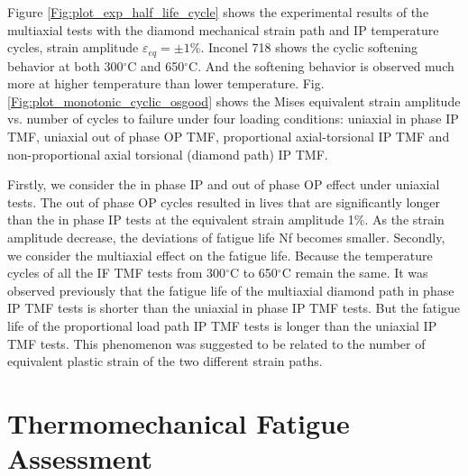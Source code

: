 \documentclass[preprint,5p,twocolumn,11pt,sort&compress]{elsarticle}
\begin{document}
Figure \ref{Fig:plot_exp_half_life_cycle} shows the experimental results of the multiaxial tests with the diamond mechanical strain path and IP temperature cycles, strain amplitude $\varepsilon_{eq} = \pm1$\%. Inconel 718 shows the cyclic softening behavior at both 300$^\circ$C and 650$^\circ$C. And the softening behavior is observed much more at higher temperature than lower temperature.
Fig. \ref{Fig:plot_monotonic_cyclic_osgood} shows the Mises equivalent strain amplitude vs. number of cycles to failure under four loading conditions: uniaxial in phase IP TMF, uniaxial out of phase OP TMF, proportional axial-torsional IP TMF and non-proportional axial torsional (diamond path) IP TMF.

Firstly, we consider the in phase IP and out of phase OP effect under uniaxial tests. The out of phase OP cycles resulted in lives that are significantly longer than the in phase IP tests at the equivalent strain amplitude 1\%. As the strain amplitude decrease, the deviations of fatigue life Nf  becomes smaller.
Secondly, we consider the multiaxial effect on the fatigue life. Because the temperature cycles of all the IF TMF tests from 300$^\circ$C to 650$^\circ$C remain the same. It was observed previously that the fatigue life of the multiaxial diamond path in phase IP TMF tests is shorter than the uniaxial in phase IP TMF tests. But the fatigue life of the proportional load path IP TMF tests is longer than the uniaxial IP TMF tests. This phenomenon was suggested to be related to the number of equivalent plastic strain of the two different strain paths.

\section{ Thermomechanical Fatigue Assessment}
\end{document}
